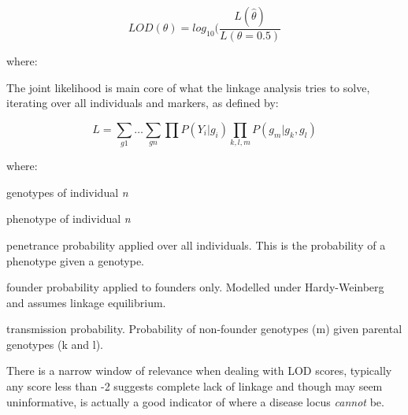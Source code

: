 \begin{equation}
LOD(\theta) = log_{10} (\frac{L(\hat{\theta})}{L(\theta = 0.5)}
\end{equation}

where:
\begin{itemize}[labelsep=2em, align=right, labelwidth=3em, labelindent=4em, leftmargin=*]
\end{itemize}

The joint likelihood is main core of what the linkage analysis tries to solve, iterating over all individuals and markers, as defined by:


\begin{equation}
L = \sum_{g1} \dots \sum_{gn} \prod P(Y_i|g_i) \prod_{k,l,m} P(g_m|g_k,g_l)
\end{equation}

where:
\begin{spacing}{1}
\begin{description}[labelsep=2em, align=right, labelwidth=3em, labelindent=4em, leftmargin=*]
\item[\(g_n\)]{genotypes of individual \textit{n}}
\item[\(Y_n\)]{phenotype of individual \textit{n}}
\item[\(P(Y_i|g_i)\)]{penetrance probability applied over all individuals. This is the probability of a phenotype given a genotype.}
\item[\(P(g_j)\)]{founder probability applied to founders only. Modelled under Hardy-Weinberg and assumes linkage equilibrium.}
\item[\(P(g_m|g_k,g_l)\)]{transmission probability. Probability of non-founder genotypes (m) given parental genotypes (k and l).}
\end{description}
\end{spacing}


There is a narrow window of relevance when dealing with LOD scores, typically any score less than -2 suggests complete lack of linkage and though may seem uninformative, is actually a good indicator of where a disease locus \textit{cannot} be.

